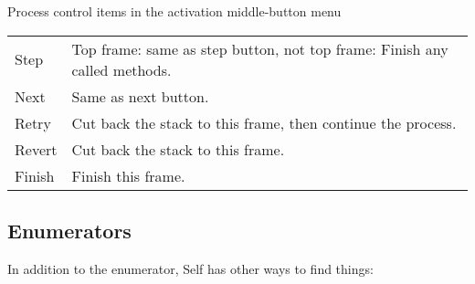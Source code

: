 \documentclass[letterpaper,10pt,english]{sphinxmanual}
\begin{document}
\begin{threeparttable}
\capstart\caption{Process control items in the activation middle-button menu}\label{\detokenize{howtoprg:id16}}
\noindent\begin{tabulary}{\linewidth}{|L|L|}
\hline
{}\relax &\relax \\
\hline
Step
&
Top frame: same as step button, not top frame: Finish any called methods.
\\
\hline
Next
&
Same as next button.
\\
\hline
Retry
&
Cut back the stack to this frame, then continue the process.
\\
\hline
Revert
&
Cut back the stack to this frame.
\\
\hline
Finish
&
Finish this frame.
\\
\hline\end{tabulary}

\end{threeparttable}

\newpage

\subsection{Enumerators}
\label{\detokenize{howtoprg:enumerators}}
In addition to the  enumerator, Self has other ways to find things:
\end{document}
